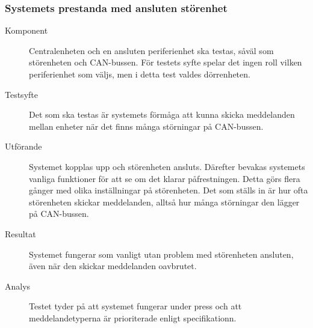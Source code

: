\documentclass[a4paper]{article}
\begin{document}
\subsubsection{Systemets prestanda med ansluten störenhet}
\label{A:störenhet}
\begin{description}
\item[Komponent] Centralenheten och en ansluten periferienhet ska testas, såväl som störenheten och CAN-bussen.
För testets syfte spelar det ingen roll vilken periferienhet som väljs, men i detta test valdes dörrenheten.

\item[Testsyfte] Det som ska testas är systemets förmåga att kunna skicka meddelanden mellan enheter när det finns många störningar på CAN-bussen.

\item[Utförande] Systemet kopplas upp och störenheten ansluts.
Därefter bevakas systemets vanliga funktioner för att se om det klarar påfrestningen.
Detta görs flera gånger med olika inställningar på störenheten.
Det som ställs in är hur ofta störenheten skickar meddelanden, alltså hur många störningar den lägger på CAN-bussen.

\item[Resultat] Systemet fungerar som vanligt utan problem med störenheten ansluten, även när den skickar meddelanden oavbrutet.

\item[Analys] Testet tyder på att systemet fungerar under press och att meddelandetyperna är prioriterade enligt specifikationn.
\end{description}
\end{document}
